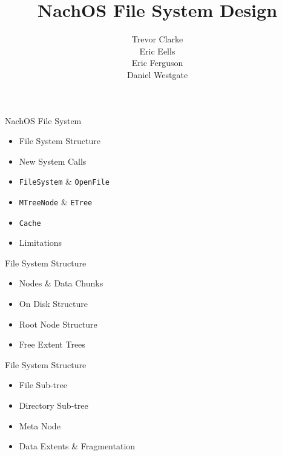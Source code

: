 \documentclass[landscape]{slides}
\title{NachOS File System Design}
\author{Trevor Clarke\\
	Eric Eells\\
	Eric Ferguson\\
	Daniel Westgate}
\newcommand{\code}[1]{\texttt{#1}}
\begin{document}
    \begin{slide}
	\maketitle
    \end{slide}

    \begin{slide}
    \end{slide}
    \begin{slide}
    \end{slide}

    \begin{slide}
	\begin{center}\large NachOS File System\end{center}
	\begin{itemize}
	    \item File System Structure
	    \item New System Calls
	    \item \code{FileSystem} \& \code{OpenFile}
	    \item \code{MTreeNode} \& \code{ETree}
	    \item \code{Cache}
	    \item Limitations
	\end{itemize}
    \end{slide}

    \begin{slide}
	\begin{center}\large File System Structure\end{center}
	\begin{itemize}
	    \item Nodes \& Data Chunks
	    \item On Disk Structure
	    \item Root Node Structure
	    \item Free Extent Trees
	\end{itemize}
    \end{slide}
    \begin{slide}
	\begin{center}\large File System Structure\end{center}
	\begin{itemize}
	    \item File Sub-tree
	    \item Directory Sub-tree
	    \item Meta Node
	    \item Data Extents \& Fragmentation
	\end{itemize}
    \end{slide}
\end{document}
